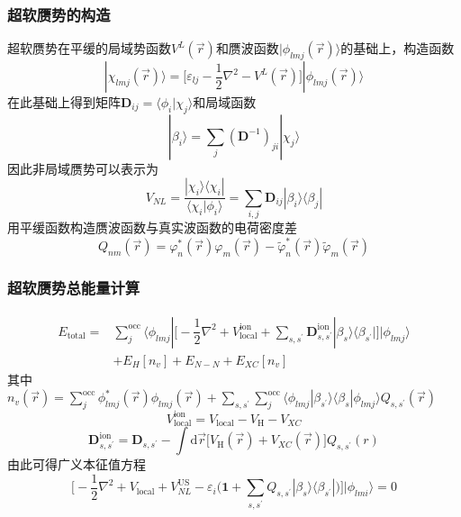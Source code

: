 \documentclass[cjk,slidestop,compress,mathserif,blue]{beamer}
\begin{document}
\frame
{
\frametitle{超软赝势的构造}
超软赝势在平缓的局域势函数$V^L(\vec r)$和赝波函数$|\phi_{lmj}(\vec r)\rangle$的基础上，构造函数
\begin{displaymath}
	|\chi_{lmj}(\vec r)\rangle=\bigg[\varepsilon_{lj}-\dfrac12\nabla^2-V^L(\vec r)\bigg]|\phi_{lmj}(\vec r)\rangle
\end{displaymath}
在此基础上得到矩阵$\mathbf{D}_{ij}=\langle\phi_i|\chi_j\rangle$和局域函数
\begin{displaymath}
	|\beta_i\rangle=\sum_j(\mathbf{D}^{-1})_{ji}|\chi_{j}\rangle
\end{displaymath}
因此非局域赝势可以表示为
\begin{displaymath}
	V_{NL}=\dfrac{|\chi_i\rangle\langle\chi_i|}{\langle\chi_i|\phi_i\rangle}=\sum_{i,j}\mathbf{D}_{ij}|\beta_i\rangle\langle\beta_j|
\end{displaymath}
用平缓函数构造赝波函数与真实波函数的电荷密度差
\begin{displaymath}
	Q_{nm}(\vec r)=\varphi_n^{\ast}(\vec r)\varphi_m(\vec r)-\tilde\varphi_n^{\ast}(\vec r)\tilde\varphi_m(\vec r)
\end{displaymath}
}

\frame
{
	\frametitle{超软赝势总能量计算}
	\begin{displaymath}
		\begin{aligned}
			E_{\mathrm{total}}=&\sum_j^{\mathrm{occ}}\langle\phi_{lmj}|\bigg[-\dfrac12\nabla^2+V_{\mathrm{local}}^{\mathrm{ion}}+\sum_{s,s^{\prime}}\mathbf{D}_{s,s^{\prime}}^{\mathrm{ion}}|\beta_s\rangle\langle\beta_{s^{\prime}}|\bigg]|\phi_{lmj}\rangle\\
			&+E_{H}[n_v]+E_{N-N}+E_{XC}[n_v]
		\end{aligned}
	\end{displaymath}
	其中$n_v(\vec r)=\sum\limits_j^{\mathrm{occ}}\phi_{lmj}^{\ast}(\vec r)\phi_{lmj}(\vec r)+\sum\limits_{s,s^{\prime}}\sum\limits_j^{\mathrm{occ}}\langle\phi_{lmj}|\beta_{s^{\prime}}\rangle\langle\beta_s|\phi_{lmj}\rangle Q_{s,s^{\prime}}(\vec r)$
	$$V_{\mathrm{local}}^{\mathrm{ion}}=V_{\mathrm{local}}-V_{\mathrm H}-V_{XC}$$
	$$\mathbf{D}_{s,s^{\prime}}^{\mathrm{ion}}=\mathbf{D}_{s,s^{\prime}}-\int\mathrm{d}\vec r\big[V_{\mathrm{H}}(\vec r)+V_{XC}(\vec r)\big]Q_{s,s^{\prime}}(r)$$
	由此可得广义本征值方程
	$$\bigg[-\dfrac12\nabla^2+V_{\mathrm{local}}+V_{NL}^{\mathrm{US}}-\varepsilon_i\bigg(\mathbf{1}+\sum_{s,s^{\prime}}Q_{s,s^{\prime}}|\beta_s\rangle\langle\beta_{s^{\prime}}|\bigg)\bigg]|\phi_{lmi}\rangle=0$$
}
\end{document}
